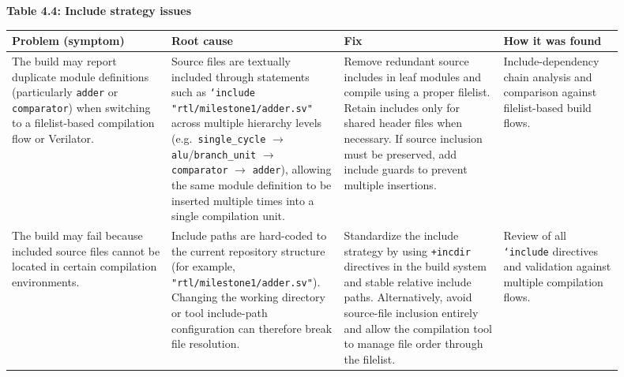 \documentclass[10pt,a4paper]{article}
\begin{document}
\textbf{Table 4.4: Include strategy issues}

\begin{center}
\small
\begin{tabular}{@{}p{0.24\linewidth}p{0.24\linewidth}p{0.24\linewidth}p{0.18\linewidth}@{}}
\toprule
\textbf{Problem (symptom)} & \textbf{Root cause} & \textbf{Fix} & \textbf{How it was found} \\
\midrule
The build may report duplicate module definitions (particularly \texttt{adder} or \texttt{comparator}) when switching to a filelist-based compilation flow or Verilator. &
Source files are textually included through statements such as \texttt{`include "rtl/milestone1/adder.sv"} across multiple hierarchy levels (e.g.\ \texttt{single\_cycle} $\rightarrow$ \texttt{alu}/\texttt{branch\_unit} $\rightarrow$ \texttt{comparator} $\rightarrow$ \texttt{adder}), allowing the same module definition to be inserted multiple times into a single compilation unit. &
Remove redundant source includes in leaf modules and compile using a proper filelist. Retain includes only for shared header files when necessary. If source inclusion must be preserved, add include guards to prevent multiple insertions. &
Include-dependency chain analysis and comparison against filelist-based build flows. \\
\addlinespace
The build may fail because included source files cannot be located in certain compilation environments. &
Include paths are hard-coded to the current repository structure (for example, \texttt{"rtl/milestone1/adder.sv"}). Changing the working directory or tool include-path configuration can therefore break file resolution. &
Standardize the include strategy by using \texttt{+incdir} directives in the build system and stable relative include paths. Alternatively, avoid source-file inclusion entirely and allow the compilation tool to manage file order through the filelist. &
Review of all \texttt{`include} directives and validation against multiple compilation flows. \\
\bottomrule
\end{tabular}


\end{center}
\end{document}
